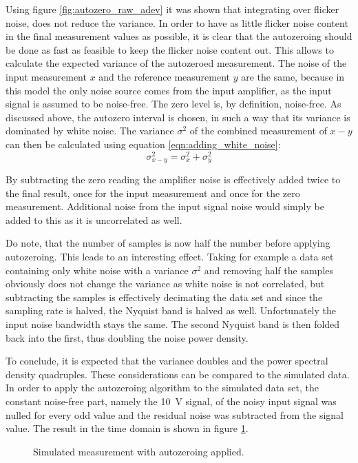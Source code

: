 Using figure \ref{fig:autozero_raw_adev} it was shown that integrating over flicker noise, does not reduce the variance. In order to have as little flicker noise content in the final measurement values as possible, it is clear that the autozeroing should be done as fast as feasible to keep the flicker noise content out. This allows to calculate the expected variance of the autozeroed measurement. The noise of the input measurement $x$ and the reference measurement $y$ are the same, because in this model the only noise source comes from the input amplifier, as the input signal is assumed to be noise-free. The zero level is, by definition, noise-free. As discussed above, the autozero interval is chosen, in such a way that its variance is dominated by white noise. The variance $\sigma^2$ of the combined measurement of $x-y$ can then be calculated using equation \ref{eqn:adding_white_noise}:
\begin{equation}
    \sigma_{x-y}^2 = \sigma_x^2 + \sigma_y^2 \label{eqn:autozeroing}
\end{equation}

By subtracting the zero reading the amplifier noise is effectively added twice to the final result, once for the input measurement and once for the zero measurement. Additional noise from the input signal noise would simply be added to this as it is uncorrelated as well.

Do note, that the number of samples is now half the number before applying autozeroing. This leads to an interesting effect. Taking for example a data set containing only white noise with a variance $\sigma^2$ and removing half the samples obviously does not change the variance as white noise is not correlated, but subtracting the samples is effectively decimating the data set and since the sampling rate is halved, the Nyquist band is halved as well. Unfortunately the input noise bandwidth stays the same. The second Nyquist band is then folded back into the first, thus doubling the noise power density.

To conclude, it is expected that the variance doubles and the power spectral density quadruples. These considerations can be compared to the simulated data. In order to apply the autozeroing algorithm to the simulated data set, the constant noise-free part, namely the \qty{10}{\V} signal, of the noisy input signal was nulled for every odd value and the residual noise was subtracted from the signal value. The result in the time domain is shown in figure \ref{fig:autozero_time}.
\begin{figure}[hb]
    \centering
    \caption{Simulated measurement with autozeroing applied.}
    \label{fig:autozero_time}
\end{figure}


